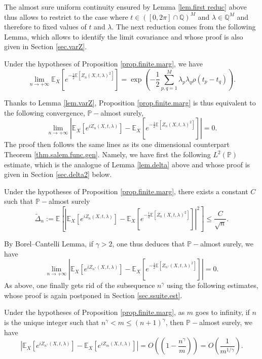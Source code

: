 \documentclass{svproc}
\newcommand{\Prob}{\mathbb{P}}
\newcommand \Esp {\mathbb{E}}
\begin{document}
The almost sure uniform continuity ensured by Lemma \ref{lem.first reduc} above thus allows to restrict to the case where $t \in ([0,2\pi]\cap \mathbb Q)^{M}$ and $\lambda \in \mathbb Q^M$ and therefore to fixed values of $t$ and $\lambda$. 
The next reduction comes from the following Lemma, which allows to identify the limit covariance and whose proof is also given in Section \ref{sec.varZ}.
\begin{lemma}\label{lem.varZ}Under the hypotheses of Proposition \ref{prop.finite.marg}, we have
\begin{equation} \label{eq.lim.func} \lim_{n \to +\infty}\Esp_X\left[e^{-\frac{1}{2}\Esp[Z_n(X,t,\lambda)^2]}\right]=\exp\left(-\frac{1}{2}\sum_{p,q=1}^{M} \lambda_p \lambda_q\rho(t_p-t_q) \right).
\end{equation}
\end{lemma} 

Thanks to Lemma \ref{lem.varZ}, Proposition \ref{prop.finite.marg} is thus equivalent to the following convergence, $\Prob-$almost surely, 
\[
\lim_{n \to +\infty} \left| \Esp_X \left[e^{iZ_n(X,t,\lambda)} \right]  - \Esp_X\left[e^{-\frac{1}{2}\Esp[Z_n(X,t,\lambda)^2]}\right]\right|=0.
\]
The proof then follows the same lines as its one dimensional counterpart Theorem \ref{thm.salem.func.gen}. Namely, we have first the following $L^2(\mathbb P)$ estimate, which is the analogue of Lemma \ref{lem.delta} above and whose proof is given in Section  \ref{sec.delta2} below.  
 
\begin{lemma} \label{lem.delta2}Under the hypotheses of Proposition \ref{prop.finite.marg}, there exists a constant $C$ such that $\mathbb P-$almost surely
\[
\widetilde{\Delta}_n:=\mathbb E\left[ \left| \Esp_X \left[e^{iZ_n(X,t,\lambda)} \right]  - \Esp_X\left[e^{-\frac{1}{2}\Esp[Z_n(X,t,\lambda)^2]}\right]\right|^2\right] \leq \frac{C}{\sqrt{n}}.
\]
\end{lemma}
\noindent
By Borel--Cantelli Lemma, if $\gamma>2$, one thus deduces that $\Prob-$almost surely, we have 
\[
\lim_{n\to +\infty}\left| \Esp_X\left[e^{iZ_{n^{\gamma}}(X,t,\lambda)}\right]-\Esp_X\left[e^{-\frac{1}{2}\Esp[Z_{n^{\gamma}}(X,t,\lambda)^2]}\right]\right|=0.
\]
As above, one finally gets rid of the subsequence $n^{\gamma}$ using the following estimates, whose proof is again postponed in Section \ref{sec.ssuite.est}.
\begin{lemma}\label{lma.ssuite.est}Under the hypotheses of Proposition \ref{prop.finite.marg}, as $m$ goes to infinity, if $n$ is the unique integer such that  $n^{\gamma}<m\leq (n+1)^\gamma$, then $\Prob-$almost surely,  we have 
\[
\left|\Esp_X \left[e^{iZ_{n^\gamma}(X,t,\lambda)}\right]-\Esp_X\left[e^{iZ_m(X,t,\lambda)}\right]\right| =O \left(\left( 1-\frac{n^{\gamma}}{m}\right)\right)=O\left(\frac{1}{m^{1/\gamma}}\right).
\]
\end{lemma}
\end{document}
